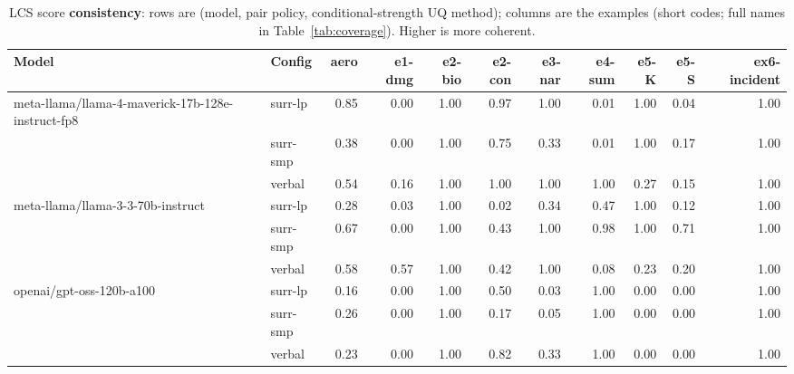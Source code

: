 \documentclass[11pt]{article}
\begin{document}
\begin{table}[htbp]
\centering
\footnotesize
\setlength{\tabcolsep}{3.5pt}
\caption{LCS score \textbf{consistency}: rows are (model, pair policy, conditional-strength UQ method); columns are the examples (short codes; full names in Table~\ref{tab:coverage}). Higher is more coherent.}
\label{tab:consistency}
\begin{tabular}{llrrrrrrrrr}
\toprule
\textbf{Model} & \textbf{Config} & \textbf{aero} & \textbf{e1-dmg} & \textbf{e2-bio} & \textbf{e2-con} & \textbf{e3-nar} & \textbf{e4-sum} & \textbf{e5-K} & \textbf{e5-S} & \textbf{ex6-incident} \\
\midrule
meta-llama/llama-4-maverick-17b-128e-instruct-fp8 & surr-lp & 0.85 & 0.00 & 1.00 & 0.97 & 1.00 & 0.01 & 1.00 & 0.04 & 1.00 \\
 & surr-smp & 0.38 & 0.00 & 1.00 & 0.75 & 0.33 & 0.01 & 1.00 & 0.17 & 1.00 \\
 & verbal & 0.54 & 0.16 & 1.00 & 1.00 & 1.00 & 1.00 & 0.27 & 0.15 & 1.00 \\
\midrule
meta-llama/llama-3-3-70b-instruct & surr-lp & 0.28 & 0.03 & 1.00 & 0.02 & 0.34 & 0.47 & 1.00 & 0.12 & 1.00 \\
 & surr-smp & 0.67 & 0.00 & 1.00 & 0.43 & 1.00 & 0.98 & 1.00 & 0.71 & 1.00 \\
 & verbal & 0.58 & 0.57 & 1.00 & 0.42 & 1.00 & 0.08 & 0.23 & 0.20 & 1.00 \\
\midrule
openai/gpt-oss-120b-a100 & surr-lp & 0.16 & 0.00 & 1.00 & 0.50 & 0.03 & 1.00 & 0.00 & 0.00 & 1.00 \\
 & surr-smp & 0.26 & 0.00 & 1.00 & 0.17 & 0.05 & 1.00 & 0.00 & 0.00 & 1.00 \\
 & verbal & 0.23 & 0.00 & 1.00 & 0.82 & 0.33 & 1.00 & 0.00 & 0.00 & 1.00 \\
\bottomrule
\end{tabular}
\end{table}
\end{document}

